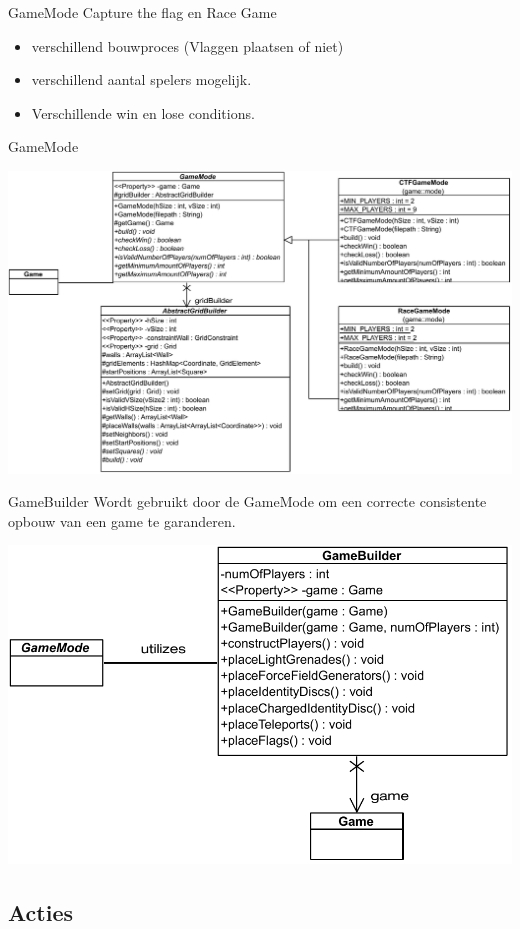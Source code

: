 \documentclass[11pt,t]{beamer}
\begin{document}
\begin{frame}{GameMode}
Capture the flag en Race Game
\begin{itemize}
\item verschillend bouwproces (Vlaggen plaatsen of niet)
\item verschillend aantal spelers mogelijk.
\item Verschillende win en lose conditions.
\end{itemize}
\end{frame}

\begin{frame}{GameMode}
\begin{center}
\includegraphics[width=0.9\linewidth]{images/gamemode}
\end{center}
\end{frame}

\begin{frame}{GameBuilder}
Wordt gebruikt door de GameMode om een correcte consistente opbouw van een game te garanderen.
\begin{center}
\includegraphics[width=0.7\linewidth]{images/gamebuilder}
\end{center}
\end{frame}


\subsection{Acties}
\end{document}

